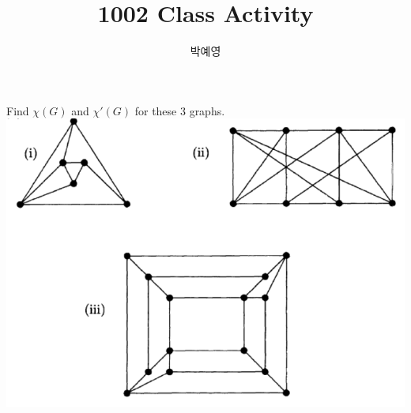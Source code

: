 \documentclass[a4paper, 12pt]{article}
\title{1002 Class Activity}
\author{박예영}
\begin{document}
\maketitle
\begin{mdframed}
Find $\chi (G)$ and $\chi ' (G)$ for these $3$ graphs.
\centering
\includegraphics[width=0.5\linewidth]{image1.png}
\end{mdframed}
\doublespacing
\end{document}

